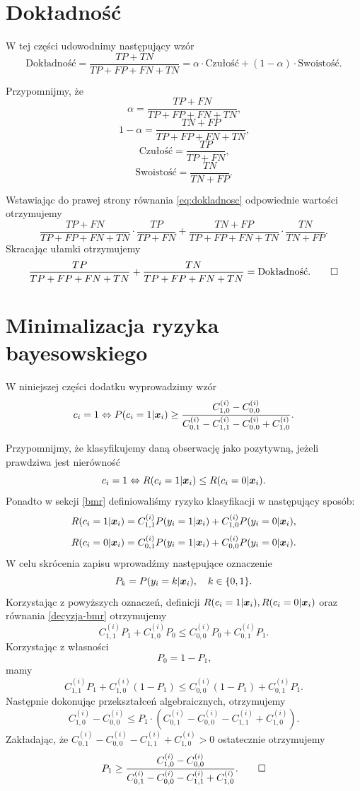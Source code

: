 \documentclass[inzynierska]{pwr_wmat_praca_dyplomowa}
\theoremstyle{plain}
\numberwithin{theorem}{chapter}
\theoremstyle{definition}
\numberwithin{theorem}{chapter}
\begin{document}
\appendix

\chapter{Dokładność}
\label{dokladnosc-dd}
W tej części udowodnimy następujący wzór
\begin{equation}
	\label{eq:dokladnosc}
	\text{Dokładność} = \frac{TP + TN}{TP + FP + FN + TN} = \alpha \cdot \text{Czułość} + (1-\alpha) \cdot \text{Swoistość} \text{.}
\end{equation}

Przypomnijmy, że
$$ \alpha = \frac{TP + FN}{TP + FP + FN + TN} \text{,} $$
$$ 1 - \alpha = \frac{TN + FP}{TP + FP + FN + TN} \text{,} $$
$$ \text{Czułość} = \frac{TP}{TP + FN} \text{,} $$
$$ \text{Swoistość} = \frac{TN}{TN + FP} \text{.} $$

Wstawiając do prawej strony równania \ref{eq:dokladnosc} odpowiednie wartości otrzymujemy
$$\frac{TP + FN}{TP + FP + FN + TN} \cdot \frac{TP}{TP + FN} + \frac{TN + FP}{TP + FP + FN + TN} \cdot \frac{TN}{TN + FP} \text{.}$$
Skracając  ułamki otrzymujemy
$$ \frac{TP}{TP + FP + FN + TN} + \frac{TN}{TP + FP + FN + TN} = \text{Dokładność} \text{.} \qed $$


\chapter{Minimalizacja ryzyka bayesowskiego}
\label{bmr-proof}
W niniejszej części dodatku wyprowadzimy wzór 
$$ c_i = 1 \Leftrightarrow P(c_i = 1|\boldsymbol{x}_{i}) \ge \frac{C^{(i)}_{1,0} - C^{(i)}_{0,0}}{C^{(i)}_{0,1} - C^{(i)}_{1,1} - C^{(i)}_{0,0} + C^{(i)}_{1,0}} \text{.}$$

Przypomnijmy, że klasyfikujemy daną obserwację jako pozytywną, jeżeli prawdziwa jest  nierówność
\begin{equation}
	\label{decyzja-bmr}
	c_i = 1 \Leftrightarrow R(c_i = 1|\boldsymbol{x}_{i}) \leq R(c_i = 0|\boldsymbol{x}_{i}) \text{.}
\end{equation}
Ponadto w sekcji \ref{bmr} definiowaliśmy ryzyko klasyfikacji w następujący sposób:
$$ R(c_i = 1|\boldsymbol{x}_{i}) = C^{(i)}_{1,1}P(y_i = 1|\boldsymbol{x}_{i}) + C^{(i)}_{1,0}P(y_i = 0|\boldsymbol{x}_{i}) \text{,}$$
$$ R(c_i = 0|\boldsymbol{x}_{i}) = C^{(i)}_{0,1}P(y_i = 1|\boldsymbol{x}_{i}) + C^{(i)}_{0,0}P(y_i = 0|\boldsymbol{x}_{i}) \text{.}$$
W celu skrócenia zapisu wprowadźmy następujące oznaczenie
$$ P_k = P(y_i = k|\boldsymbol{x}_{i}), \quad k \in \{0,1\} \text{.}$$
Korzystając z powyższych oznaczeń, definicji $R(c_i = 1|\boldsymbol{x}_{i}), R(c_i = 0|\boldsymbol{x}_{i})$ oraz równania \eqref{decyzja-bmr} otrzymujemy
$$ C^{(i)}_{1,1}P_1 +  C^{(i)}_{1,0}P_0 \leq  C^{(i)}_{0,0}P_0 +  C^{(i)}_{0,1}P_1 \text{.}$$
Korzystając z własności 
$$ P_0 = 1 - P_1 \text{,}$$
mamy
$$  C^{(i)}_{1,1}P_1 +  C^{(i)}_{1,0}(1-P_1) \leq  C^{(i)}_{0,0}(1-P_1) +  C^{(i)}_{0,1}P_1 \text{.}$$
Następnie dokonując przekształceń algebraicznych, otrzymujemy
$$  C^{(i)}_{1,0}- C^{(i)}_{0,0} \leq P_1 \cdot ( C^{(i)}_{0,1} -  C^{(i)}_{0,0} -  C^{(i)}_{1,1} +  C^{(i)}_{1,0}) \text{.} $$
Zakładając, że $ C^{(i)}_{0,1} -  C^{(i)}_{0,0} -  C^{(i)}_{1,1} +  C^{(i)}_{1,0} > 0$ ostatecznie otrzymujemy
$$ P_1 \geq \frac{ C^{(i)}_{1,0}- C^{(i)}_{0,0}}{ C^{(i)}_{0,1} -  C^{(i)}_{0,0} -  C^{(i)}_{1,1} +  C^{(i)}_{1,0}}. \qed $$
\end{document}
